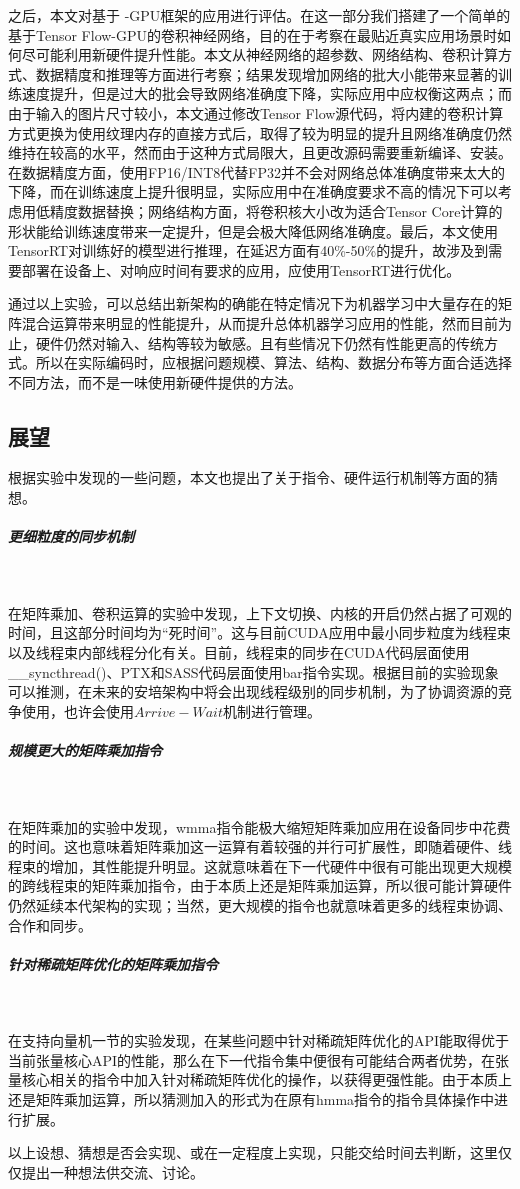 \par 之后，本文对基于 -GPU框架的应用进行评估。在这一部分我们搭建了一个简单的基于Tensor Flow-GPU的卷积神经网络，目的在于考察在最贴近真实应用场景时如何尽可能利用新硬件提升性能。本文从神经网络的超参数、网络结构、卷积计算方式、数据精度和推理等方面进行考察；结果发现增加网络的批大小能带来显著的训练速度提升，但是过大的批会导致网络准确度下降，实际应用中应权衡这两点；而由于输入的图片尺寸较小，本文通过修改Tensor Flow源代码，将内建的卷积计算方式更换为使用纹理内存的直接方式后，取得了较为明显的提升且网络准确度仍然维持在较高的水平，然而由于这种方式局限大，且更改源码需要重新编译、安装。在数据精度方面，使用FP16/INT8代替FP32并不会对网络总体准确度带来太大的下降，而在训练速度上提升很明显，实际应用中在准确度要求不高的情况下可以考虑用低精度数据替换；网络结构方面，将卷积核大小改为适合Tensor Core计算的形状能给训练速度带来一定提升，但是会极大降低网络准确度。最后，本文使用TensorRT对训练好的模型进行推理，在延迟方面有40\%-50\%的提升，故涉及到需要部署在设备上、对响应时间有要求的应用，应使用TensorRT进行优化。
\par 通过以上实验，可以总结出新架构的确能在特定情况下为机器学习中大量存在的矩阵混合运算带来明显的性能提升，从而提升总体机器学习应用的性能，然而目前为止，硬件仍然对输入、结构等较为敏感。且有些情况下仍然有性能更高的传统方式。所以在实际编码时，应根据问题规模、算法、结构、数据分布等方面合适选择不同方法，而不是一味使用新硬件提供的方法。
\subsection{展望}
\par 根据实验中发现的一些问题，本文也提出了关于指令、硬件运行机制等方面的猜想。
\subparagraph{更细粒度的同步机制}~{}
\par 在矩阵乘加、卷积运算的实验中发现，上下文切换、内核的开启仍然占据了可观的时间，且这部分时间均为“死时间”。这与目前CUDA应用中最小同步粒度为线程束以及线程束内部线程分化有关。目前，线程束的同步在CUDA代码层面使用\_\_syncthread()、PTX和SASS代码层面使用bar指令实现。根据目前的实验现象可以推测，在未来的安培架构中将会出现线程级别的同步机制，为了协调资源的竞争使用，也许会使用$ Arrive-Wait $机制进行管理。
\subparagraph{规模更大的矩阵乘加指令}~{}
\par 在矩阵乘加的实验中发现，wmma指令能极大缩短矩阵乘加应用在设备同步中花费的时间。这也意味着矩阵乘加这一运算有着较强的并行可扩展性，即随着硬件、线程束的增加，其性能提升明显\cite{SCALABLITY}。这就意味着在下一代硬件中很有可能出现更大规模的跨线程束的矩阵乘加指令，由于本质上还是矩阵乘加运算，所以很可能计算硬件仍然延续本代架构的实现；当然，更大规模的指令也就意味着更多的线程束协调、合作和同步。
\subparagraph{针对稀疏矩阵优化的矩阵乘加指令}~{}
\par 在支持向量机一节的实验发现，在某些问题中针对稀疏矩阵优化的API能取得优于当前张量核心API的性能，那么在下一代指令集中便很有可能结合两者优势，在张量核心相关的指令中加入针对稀疏矩阵优化的操作，以获得更强性能。由于本质上还是矩阵乘加运算，所以猜测加入的形式为在原有hmma指令的指令具体操作中进行扩展。
\par 以上设想、猜想是否会实现、或在一定程度上实现，只能交给时间去判断，这里仅仅提出一种想法供交流、讨论。
